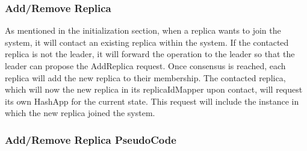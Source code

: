 \documentclass[sigconf]{acmart}
\begin{document}
\subsubsection{Add/Remove Replica}
As mentioned in the initialization section, when a replica wants to join the system, it will contact an existing replica within the system. If the contacted replica is not the leader, it will forward the operation to the leader so that the leader can propose the AddReplica request. Once consensus is reached, each replica will add the new replica to their membership. The contacted replica, which will now the new replica in its replicaIdMapper upon contact, will request its own HashApp for the current state. This request will include the instance in which the new replica joined the system.

\subsubsection{Add/Remove Replica PseudoCode}
\end{document}
